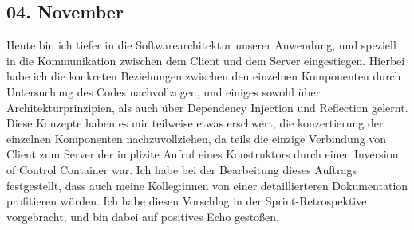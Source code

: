 \subsection{04. November}
Heute bin ich tiefer in die Softwarearchitektur unserer Anwendung, und speziell in die Kommunikation zwischen dem Client und dem Server eingestiegen. Hierbei habe ich die konkreten Beziehungen zwischen den einzelnen Komponenten durch Untersuchung des Codes nachvollzogen, und einiges sowohl über Architekturprinzipien, als auch über Dependency Injection und Reflection gelernt. Diese Konzepte haben es mir teilweise etwas erschwert, die konzertierung der einzelnen Komponenten nachzuvollziehen, da  teils die einzige Verbindung von Client zum Server der implizite Aufruf eines Konstruktors durch einen Inversion of Control Container war. Ich habe bei der Bearbeitung dieses Auftrags festgestellt, dass auch meine Kolleg:innen von einer detaillierteren Dokumentation profitieren würden. Ich habe diesen Vorschlag in der Sprint-Retrospektive vorgebracht, und bin dabei auf positives Echo gestoßen.